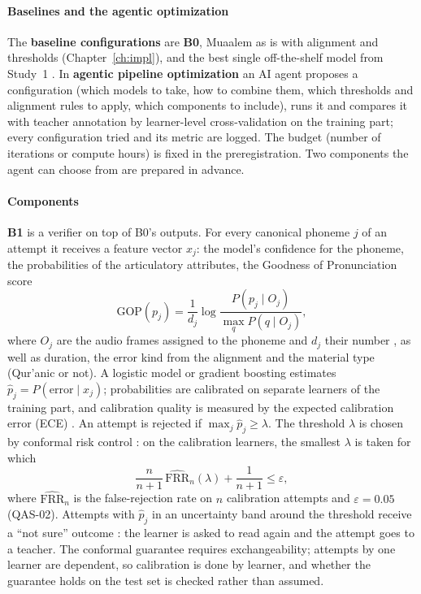 \paragraph{Baselines and the agentic optimization} The \textbf{baseline configurations} are \textbf{B0}, Muaalem as is with
alignment and thresholds (Chapter~\ref{ch:impl}), and the best single off-the-shelf model from Study~1
. In \textbf{agentic pipeline optimization} an AI
agent proposes a configuration (which models to take, how to combine them, which thresholds and alignment rules
to apply, which components to include), runs it and compares it with teacher annotation by learner-level
cross-validation on the training part; every configuration tried and its metric are logged. The budget
(number of iterations or compute hours) is fixed in the preregistration. Two components the agent can choose
from are prepared in advance.

\paragraph{Components} \textbf{B1} is a verifier on top of B0's outputs.
For every canonical phoneme $j$ of an attempt it receives a feature vector $x_j$: the model's confidence for
the phoneme, the probabilities of the articulatory attributes, the Goodness of Pronunciation score
\begin{equation}
  \mathrm{GOP}(p_j) = \frac{1}{d_j}\log\frac{P(p_j\mid O_j)}{\max_{q} P(q\mid O_j)},
\end{equation}
where $O_j$ are the audio frames assigned to the phoneme and $d_j$ their number \cite{SRC-115}, as well as
duration, the error kind from the alignment and the material type (Qur'anic or not). A logistic model or
gradient boosting estimates $\hat p_j = P(\text{error}\mid x_j)$; probabilities are calibrated on separate
learners of the training part, and calibration quality is measured by the expected calibration error (ECE)
\cite{SRC-112}. An attempt is rejected if $\max_j \hat p_j \ge \lambda$. The threshold $\lambda$ is chosen by
conformal risk control \cite{SRC-114}: on the calibration learners, the smallest $\lambda$ is taken for which
\begin{equation}
  \frac{n}{n+1}\,\widehat{\mathrm{FRR}}_n(\lambda) + \frac{1}{n+1} \le \varepsilon,
\end{equation}
where $\widehat{\mathrm{FRR}}_n$ is the false-rejection rate on $n$ calibration attempts and
$\varepsilon=0.05$ (QAS-02). Attempts with $\hat p_j$ in an uncertainty band around the threshold receive a
``not sure'' outcome \cite{SRC-117}: the learner is asked to read again and the attempt goes to a teacher.
The conformal guarantee requires exchangeability; attempts by one learner are dependent, so calibration is
done by learner, and whether the guarantee holds on the test set is checked rather than assumed.

